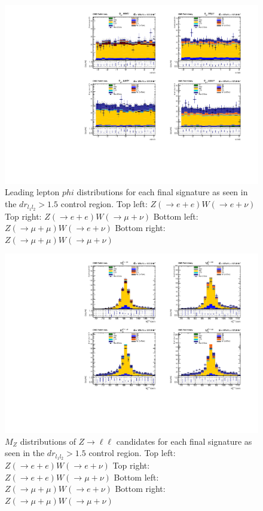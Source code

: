 \begin{figure}[tph]
  \centering
  \includegraphics[width=\textwidth]{fig/Run2/KFactorIncluded_HPhil1_CR1_A_Run2_HPRun2_M600.pdf}
  \caption{Leading lepton $phi$ distributions for each final
    signature as seen in the $dr_{l_{1}l_{2}} > 1.5$ control region.
    Top left: $Z(\rightarrow e+e)W(\rightarrow e+\nu)$
    Top right: $Z(\rightarrow e+e)W(\rightarrow \mu+\nu)$
    Bottom left: $Z(\rightarrow \mu+\mu)W(\rightarrow e+\nu)$
    Bottom right: $Z(\rightarrow \mu+\mu)W(\rightarrow \mu+\nu)$}
  \label{fig:CR1_Run2_HPhil1}
\end{figure}

\begin{figure}[tph]
  \centering
  \includegraphics[width=\textwidth]{fig/Run2/KFactorIncluded_HMassZ_CR1_A_Run2_HMRun2_M600.pdf}
  \caption{$M_{Z}$ distributions of $Z\rightarrow\ell\ell$ candidates for each final
    signature as seen in the $dr_{l_{1}l_{2}} > 1.5$ control region.
    Top left: $Z(\rightarrow e+e)W(\rightarrow e+\nu)$
    Top right: $Z(\rightarrow e+e)W(\rightarrow \mu+\nu)$
    Bottom left: $Z(\rightarrow \mu+\mu)W(\rightarrow e+\nu)$
    Bottom right: $Z(\rightarrow \mu+\mu)W(\rightarrow \mu+\nu)$}
  \label{fig:CR1_Run2_HMassZ}
\end{figure}

